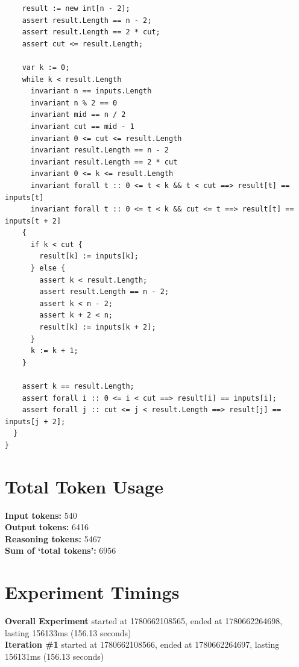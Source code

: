 \documentclass{article}
\begin{document}
\begin{lstlisting}
    result := new int[n - 2];
    assert result.Length == n - 2;
    assert result.Length == 2 * cut;
    assert cut <= result.Length;

    var k := 0;
    while k < result.Length
      invariant n == inputs.Length
      invariant n % 2 == 0
      invariant mid == n / 2
      invariant cut == mid - 1
      invariant 0 <= cut <= result.Length
      invariant result.Length == n - 2
      invariant result.Length == 2 * cut
      invariant 0 <= k <= result.Length
      invariant forall t :: 0 <= t < k && t < cut ==> result[t] == inputs[t]
      invariant forall t :: 0 <= t < k && cut <= t ==> result[t] == inputs[t + 2]
    {
      if k < cut {
        result[k] := inputs[k];
      } else {
        assert k < result.Length;
        assert result.Length == n - 2;
        assert k < n - 2;
        assert k + 2 < n;
        result[k] := inputs[k + 2];
      }
      k := k + 1;
    }

    assert k == result.Length;
    assert forall i :: 0 <= i < cut ==> result[i] == inputs[i];
    assert forall j :: cut <= j < result.Length ==> result[j] == inputs[j + 2];
  }
}
\end{lstlisting}
\section*{Total Token Usage}
\textbf{Input tokens: }540
\\\textbf{Output tokens: }6416
\\\textbf{Reasoning tokens: }5467
\\\textbf{Sum of `total tokens': }6956
\section*{Experiment Timings}
\textbf{Overall Experiment} started at 1780662108565, ended at 1780662264698, lasting 156133ms (156.13 seconds)
\\\textbf{Iteration \#1} started at 1780662108566, ended at 1780662264697, lasting 156131ms (156.13 seconds)
\end{document}
